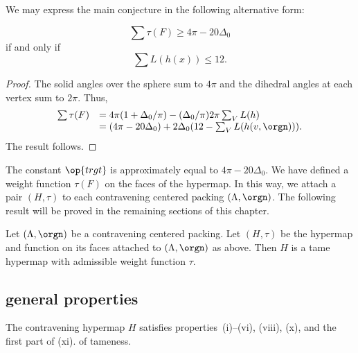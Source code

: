We may express the main conjecture in the following alternative form:

\begin{lemma}
$$
\sum \tau (F) \ge 4\pi - 20\Delta_0
$$
if and only if
$$
\sum L(h(x)) \le 12.
$$
\end{lemma}

\begin{proof}
The solid angles over the sphere sum to $4\pi$ and the dihedral angles at each vertex sum to $2\pi$. 
Thus,
\begin{equation}\label{eqn:delta0}
\begin{array}{lll}
\sum \tau (F) 
&= 4\pi (1 + \Delta_0/\pi) - (\Delta_0/\pi) 2\pi \sum_{V} L(h)\\

&= (4\pi - 20\Delta_0) + 2\Delta_0 (12 - \sum_V L(h(v,\orgn))).
\end{array}
\end{equation}
The result follows.
\end{proof}

The constant $\op{trgt}$ is approximately equal to $4\pi - 20\Delta_0$.
We have defined a weight function $\tau(F)$ on the faces of the hypermap.  In this way, we attach a pair $(H,\tau)$ to each contravening centered packing $(\Lambda,\orgn)$.  The following result will be proved in the remaining sections of this chapter.


\begin{theorem} \label{theorem:contravene}
Let $(\Lambda,\orgn)$ be a contravening centered packing.  Let $(H,\tau)$ be
the hypermap and function on its faces attached to $(\Lambda,\orgn)$ as above.
Then $H$ is a tame hypermap with admissible weight function $\tau$.
\end{theorem}




\subsection{general properties}
    \label{sec:startame}



\begin{lemma} %
The contravening hypermap $H$ satisfies properties~(i)--(vi), (viii),  (x), and the first part of (xi).
of tameness.
\end{lemma}

